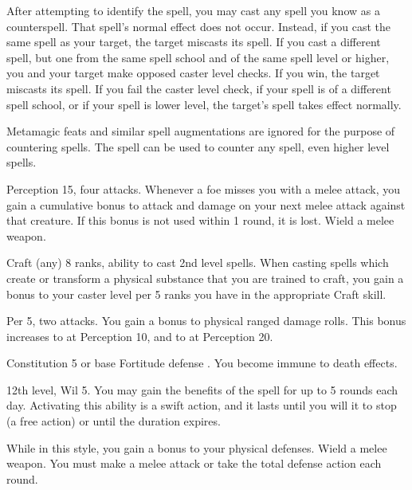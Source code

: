After attempting to identify the spell, you may cast any spell you know as a counterspell.
That spell's normal effect does not occur.
Instead, if you cast the same spell as your target, the target miscasts its spell.
If you cast a different spell, but one from the same spell school and of the same spell level or higher, you and your target make opposed caster level checks.
If you win, the target miscasts its spell.
If you fail the caster level check, if your spell is of a different spell school, or if your spell is lower level, the target's spell takes effect normally.

Metamagic feats and similar spell augmentations are ignored for the purpose of countering spells.
The 
spell can be used to counter any spell, even higher level spells.

\featpres Perception 15, four attacks.
\featben Whenever a foe misses you with a melee attack, you gain a cumulative  bonus to attack and damage on your next melee attack against that creature.
If this bonus is not used within 1 round, it is lost.
\stylereq Wield a melee weapon.

\featpres Craft (any) 8 ranks, ability to cast 2nd level spells.
\featben When casting spells which create or transform a physical substance that you are trained to craft, you gain a  bonus to your caster level per 5 ranks you have in the appropriate Craft skill.

\featpres Per 5, two attacks.
\featben You gain a  bonus to physical ranged damage rolls.
This bonus increases to  at Perception 10, and to  at Perception 20.

\featpre Constitution 5 or base Fortitude defense .
\featben You become immune to death effects.

\featpres 12th level, Wil 5.
\featben You may gain the benefits of the 
spell for up to 5 rounds each day.
Activating this ability is a swift action, and it lasts until you will it to stop (a free action) or until the duration expires.

\featben While in this style, you gain a  bonus to your physical defenses.
\stylereq Wield a melee weapon. You must make a melee attack or take the total defense action each round.

